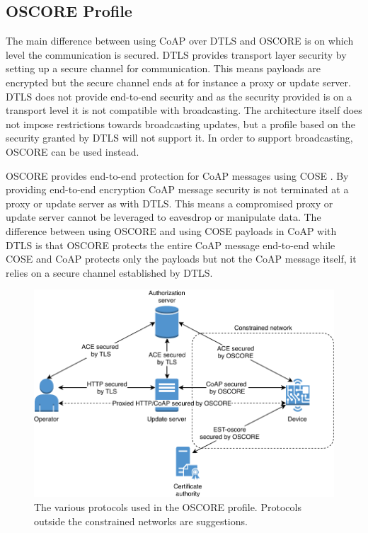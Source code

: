 \documentclass[0-thesis.tex]{subfiles}
\begin{document}
\subsection{OSCORE Profile}
\label{sec:oscore-profile}
The main difference between using CoAP over DTLS and OSCORE is on which level the
communication is secured. DTLS provides transport layer security by setting up a secure
channel for communication. This means payloads are encrypted but the secure channel ends
at for instance a proxy or update server. DTLS does not provide end-to-end security and as
the security provided is on a transport level it is not compatible with broadcasting. The
architecture itself does not impose restrictions towards broadcasting updates, but a
profile based on the security granted by DTLS will not support it. In order to support
broadcasting, OSCORE can be used instead.

OSCORE provides end-to-end protection for CoAP messages using COSE \parencite{oscore}. By
providing end-to-end encryption CoAP message security is not terminated at a proxy or
update server as with DTLS. This means a compromised proxy or update server cannot be
leveraged to eavesdrop or manipulate data. The difference between using OSCORE and using
COSE payloads in CoAP with DTLS is that OSCORE protects the entire CoAP message end-to-end
while COSE and CoAP protects only the payloads but not the CoAP message itself, it relies
on a secure channel established by DTLS. 

\begin{figure}
    \caption{The various protocols used in the OSCORE profile. Protocols outside the constrained networks are suggestions.}
    \label{fig:oscore-profile}
    \includegraphics{images/oscore-profile.pdf}
\end{figure}
\end{document}
